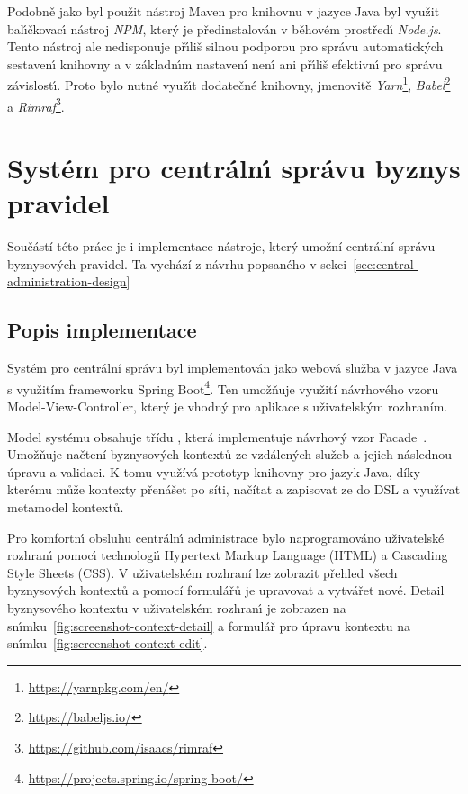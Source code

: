 Podobně jako byl použit nástroj Maven pro knihovnu v jazyce Java byl
využit bal\'{\i}čkovac\'{\i} nástroj \textit{NPM}, kter\'y je předinstalován
v běhovém prostřed\'{\i} \textit{Node.js}. Tento nástroj ale nedisponuje
př\'{\i}liš silnou podporou pro správu automatick\'ych sestaven\'{\i} knihovny
a v základn\'{\i}m nastaven\'{\i} nen\'{\i} ani př\'{\i}liš efektivn\'{\i} pro správu závislost\'{\i}.
Proto bylo nutné využ\'{\i}t dodatečné knihovny, jmenovitě
\textit{Yarn}\footnote{\url{https://yarnpkg.com/en/}}, \textit{Babel}\footnote{\url{https://babeljs.io/}} a
\textit{Rimraf}\footnote{\url{https://github.com/isaacs/rimraf}}.

\section{Systém pro centráln\'{\i} správu byznys pravidel}\label{sec:central-administration}

Součástí této práce je i implementace nástroje, který umožní centrální správu byznysových
pravidel. Ta vychází z návrhu popsaného v sekci~\ref{sec:central-administration-design}

\subsection{Popis implementace}

Systém pro centrální správu byl implementován jako webová služba v jazyce Java
s využitím frameworku Spring Boot\footnote{\url{https://projects.spring.io/spring-boot/}}.
Ten umožňuje využití návrhového vzoru Model-View-Controller, který je vhodný
pro aplikace s uživatelským rozhraním.

Model systému obsahuje třídu , která implementuje
návrhový vzor Facade~\cite{fowler2002patterns}. Umožňuje načtení byznysových
kontextů ze vzdálených služeb a jejich následnou úpravu a validaci. K tomu využívá
prototyp knihovny pro jazyk Java, díky kterému může kontexty přenášet po síti,
načítat a zapisovat ze do \gls{DSL} a využívat metamodel kontextů.

Pro komfortn\'{\i} obsluhu centráln\'{\i} administrace bylo naprogramováno
uživatelské rozhran\'{\i} pomoc\'{\i} technologi\'{\i} Hypertext Markup Language
(HTML) a Cascading Style Sheets (\gls{CSS}). V uživatelském rozhraní lze zobrazit
přehled všech byznysových kontextů a pomocí formulářů je upravovat a vytvářet nové.
Detail byznysového kontextu v uživatelském rozhran\'{\i} je zobrazen
na sn\'{\i}mku~\ref{fig:screenshot-context-detail} a formulář pro úpravu kontextu
na sn\'{\i}mku~\ref{fig:screenshot-context-edit}.

